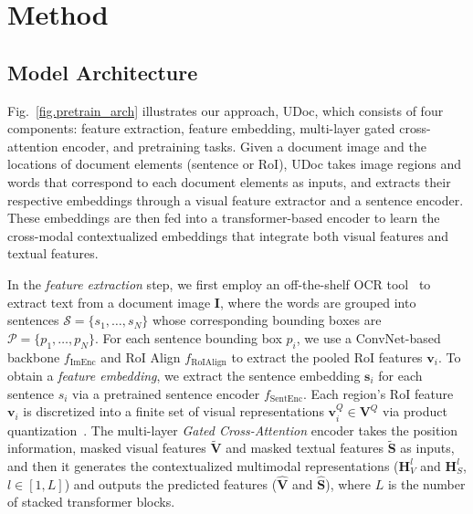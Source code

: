 \documentclass{article}
\begin{document}
	\section{Method}
	\subsection{Model Architecture}
	Fig.~\ref{fig.pretrain_arch} {illustrates} {our} {approach, UDoc, which} consists of four {components}: feature extraction, feature embedding, multi-layer gated cross-attention encoder, and pretraining tasks. Given a document image {and the locations of document elements (sentence or RoI)}, UDoc takes {image regions} and words that correspond to each document elements as {inputs,} 
	and {extracts} their respective embeddings through a visual feature extractor and a sentence encoder. These embeddings are then fed into a transformer-based encoder to learn the cross-modal contextualized embeddings that integrate both visual features and textual features.
	
	In the \textit{feature extraction} step, we first employ an off-the-shelf OCR tool~\cite{easyocr} to extract text from a document image $\mathbf{I}$, where the words are grouped into sentences $\mathcal{S}=\{s_1,\ldots,s_N\}$ whose corresponding bounding boxes are $\mathcal{P}=\{p_1,\ldots,p_N\}$. For each sentence bounding box $p_i$, we use a ConvNet-based backbone $f_{\text{ImEnc}}$ and RoI Align \cite{he2017mask} $f_{\text{RoIAlign}}$ to extract the pooled RoI features $\bm{v}_i$.
	To obtain a \textit{feature embedding}, we extract the sentence embedding $\bm{s}_i$ for each sentence $s_i$ via a pretrained sentence encoder $f_{\text{SentEnc}}$. Each region's RoI feature $\bm{v}_i$ is discretized into a finite set of visual representations $\bm{v}_i^Q \in \mathbf{V}^Q$ via product quantization~\cite{jegou2010product}. The multi-layer \textit{Gated Cross-Attention} encoder takes the position information, masked visual features $\mathbf{\tilde{V}}$ and masked textual features $\mathbf{\tilde{S}}$ as inputs, and then {it} generates the contextualized multimodal representations {($\mathbf{H}_V^{l}$ and $\mathbf{H}_S^{l}$, $l\in [1,L]$)} {and outputs the predicted features ($\mathbf{\hat{V}}$ and $\mathbf{\hat{S}}$)}, where $L$ is the number of stacked {transformer} blocks.
	
\end{document}
